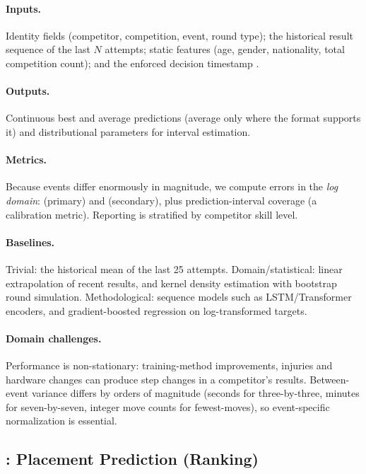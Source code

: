 \paragraph{Inputs.}
Identity fields (competitor, competition, event, round type); the historical
result sequence of the last $N$ attempts; static features (age, gender,
nationality, total competition count); and the enforced decision timestamp
\asof{}.

\paragraph{Outputs.}
Continuous best and average predictions (average only where the format
supports it) and distributional parameters for interval estimation.

\paragraph{Metrics.}
Because events differ enormously in magnitude, we compute errors in the
\emph{log domain}: \maelog{} (primary) and \rmselog{} (secondary), plus
prediction-interval coverage (a calibration metric). Reporting is stratified by
competitor skill level.

\paragraph{Baselines.}
Trivial: the historical mean of the last 25 attempts. Domain/statistical:
linear extrapolation of recent results, and kernel density estimation with
bootstrap round simulation. Methodological: sequence models such as
LSTM/Transformer encoders, and gradient-boosted regression on log-transformed
targets.

\paragraph{Domain challenges.}
Performance is non-stationary: training-method improvements, injuries and
hardware changes can produce step changes in a competitor's results.
Between-event variance differs by orders of magnitude (seconds for
three-by-three, minutes for seven-by-seven, integer move counts for
fewest-moves), so event-specific normalization is essential.

\subsection{: Placement Prediction (Ranking)}
\label{sec:task2}

